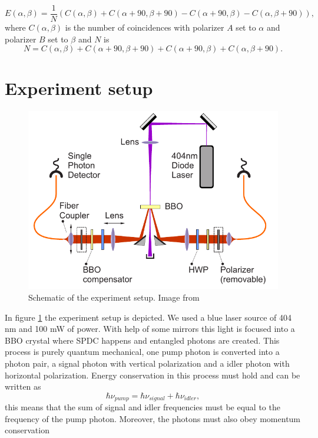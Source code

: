 \documentclass[a4paper,10pt]{article}
\begin{document}
\begin{equation}\label{expectationvalue}E(\alpha,\beta) = \frac{1}{N}(C(\alpha,\beta)+C(\alpha+90,\beta+90)-C(\alpha+90,\beta)-C(\alpha,\beta+90)),\end{equation}
where $C(\alpha,\beta)$ is the number of coincidences with polarizer $A$ set to $\alpha$ and polarizer $B$ set to $\beta$ and $N$ is
\begin{equation}N = C(\alpha,\beta)+C(\alpha+90,\beta+90)+C(\alpha+90,\beta)+C(\alpha,\beta+90).\end{equation}
\section{Experiment setup}
\begin{figure}[H]
\centering
\includegraphics[width=.9\textwidth]{img/setup}
\caption{Schematic of the experiment setup. Image from \cite{skriptum}}\label{setup}
\end{figure}
In figure \ref{setup} the experiment setup is depicted. We used a blue laser source of 404 nm and 100 mW of power. With help of some mirrors this light is focused into a BBO crystal where SPDC happens and entangled photons are created. This process is purely quantum mechanical, one pump photon is converted into a photon pair, a signal photon with vertical polarization and a idler photon with horizontal polarization. Energy conservation in this process must hold and can be written as
\begin{equation}\hbar \nu_{pump} = \hbar \nu_{signal} + \hbar\nu_{idler},\end{equation}
this means that the sum of signal and idler frequencies must be equal to the frequency of the pump photon. Moreover, the photons must also obey momentum conservation
\end{document}
